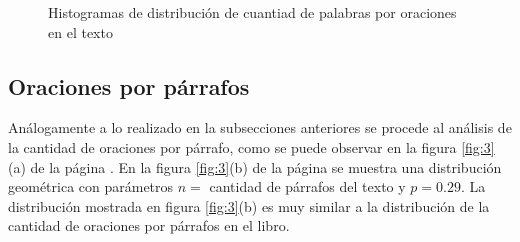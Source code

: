 \documentclass{article}
\begin{document}
 
\begin{figure}
\centering
{}
\label{fig:a}
\centering
{}
\label{fig:b}
\vspace{-0.2cm}
\caption{Histogramas de distribución de cuantiad de palabras por oraciones en el texto}
\label{fig:2} 
\end{figure}
 
 \subsection{Oraciones por párrafos}
Análogamente a lo realizado en la subsecciones anteriores se procede al análisis de la cantidad de oraciones por párrafo, como se puede observar en la figura \ref{fig:3}(a) de la página \pageref{fig:3}. En la figura \ref{fig:3}(b) de la página \pageref{fig:3} se muestra una distribución geométrica con parámetros $n =$ cantidad de párrafos del texto y $p = 0.29 $. La distribución mostrada en figura \ref{fig:3}(b) es muy similar a la distribución de la cantidad de oraciones por párrafos en el libro.
 
\end{document}
